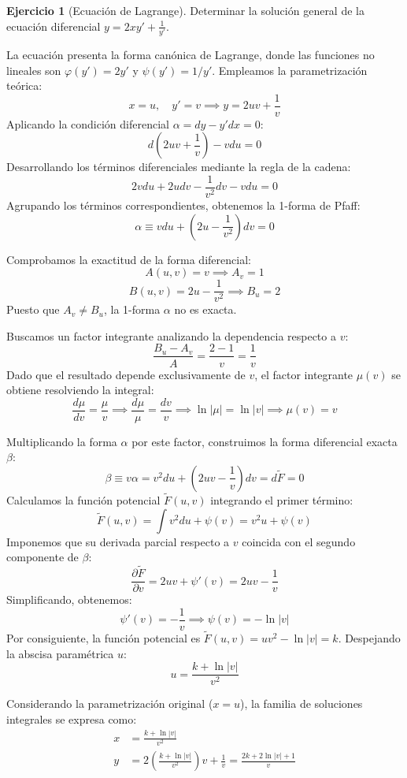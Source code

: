 \documentclass[11pt,a4paper]{article}
\theoremstyle{definition}
\newtheorem{exercise}{Ejercicio}[section]
\theoremstyle{plain}
\begin{document}
\begin{exercise}[Ecuación de Lagrange]
Determinar la solución general de la ecuación diferencial $y = 2xy' + \frac{1}{y'}$.
\end{exercise}

\begin{tcolorbox}
La ecuación presenta la forma canónica de Lagrange, donde las funciones no lineales son $\varphi(y') = 2y'$ y $\psi(y') = 1/y'$. Empleamos la parametrización teórica:
$$ x = u, \quad y' = v \implies y = 2uv + \frac{1}{v} $$
Aplicando la condición diferencial $\alpha = dy - y'dx = 0$:
$$ d\left( 2uv + \frac{1}{v} \right) - v du = 0 $$
Desarrollando los términos diferenciales mediante la regla de la cadena:
$$ 2v du + 2u dv - \frac{1}{v^2}dv - v du = 0 $$
Agrupando los términos correspondientes, obtenemos la 1-forma de Pfaff:
$$ \alpha \equiv v du + \left( 2u - \frac{1}{v^2} \right)dv = 0 $$

Comprobamos la exactitud de la forma diferencial:
$$ A(u,v) = v \implies A_v = 1 $$
$$ B(u,v) = 2u - \frac{1}{v^2} \implies B_u = 2 $$
Puesto que $A_v \neq B_u$, la 1-forma $\alpha$ no es exacta. 

Buscamos un factor integrante analizando la dependencia respecto a $v$:
$$ \frac{B_u - A_v}{A} = \frac{2 - 1}{v} = \frac{1}{v} $$
Dado que el resultado depende exclusivamente de $v$, el factor integrante $\mu(v)$ se obtiene resolviendo la integral:
$$ \frac{d\mu}{dv} = \frac{\mu}{v} \implies \frac{d\mu}{\mu} = \frac{dv}{v} \implies \ln|\mu| = \ln|v| \implies \mu(v) = v $$

Multiplicando la forma $\alpha$ por este factor, construimos la forma diferencial exacta $\beta$:
$$ \beta \equiv v\alpha = v^2 du + \left( 2uv - \frac{1}{v} \right)dv = d\tilde{F} = 0 $$
Calculamos la función potencial $\tilde{F}(u,v)$ integrando el primer término:
$$ \tilde{F}(u,v) = \int v^2 du + \psi(v) = v^2 u + \psi(v) $$
Imponemos que su derivada parcial respecto a $v$ coincida con el segundo componente de $\beta$:
$$ \frac{\partial \tilde{F}}{\partial v} = 2uv + \psi'(v) = 2uv - \frac{1}{v} $$
Simplificando, obtenemos:
$$ \psi'(v) = -\frac{1}{v} \implies \psi(v) = -\ln|v| $$
Por consiguiente, la función potencial es $\tilde{F}(u,v) = u v^2 - \ln|v| = k$.
Despejando la abscisa paramétrica $u$:
$$ u = \frac{k + \ln|v|}{v^2} $$

Considerando la parametrización original ($x=u$), la familia de soluciones integrales se expresa como:
\begin{align*}
    x &= \frac{k + \ln|v|}{v^2} \\
    y &= 2\left(\frac{k + \ln|v|}{v^2}\right)v + \frac{1}{v} = \frac{2k + 2\ln|v| + 1}{v}
\end{align*}


\end{tcolorbox}
\end{document}
